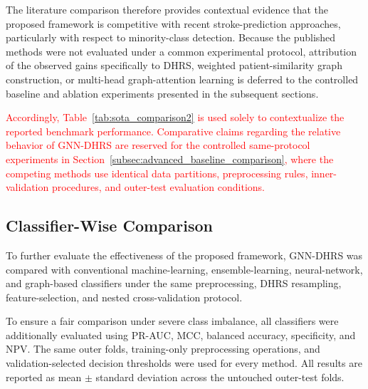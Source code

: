 \documentclass[pdflatex,sn-mathphys-num]{sn-jnl}%
\theoremstyle{thmstyleone}%
\theoremstyle{thmstyletwo}%
\theoremstyle{thmstylethree}%
\begin{document}
{
The literature comparison therefore provides contextual evidence that the
proposed framework is competitive with recent stroke-prediction approaches,
particularly with respect to minority-class detection. Because the published
methods were not evaluated under a common experimental protocol, attribution
of the observed gains specifically to DHRS, weighted patient-similarity graph
construction, or multi-head graph-attention learning is deferred to the
controlled baseline and ablation experiments presented in the subsequent
sections.
}

\textcolor{red}{
Accordingly, Table~\ref{tab:sota_comparison2} is used solely to contextualize
the reported benchmark performance. Comparative claims regarding the relative
behavior of GNN-DHRS are reserved for the controlled same-protocol
experiments in Section~\ref{subsec:advanced_baseline_comparison}, where the
competing methods use identical data partitions, preprocessing rules,
inner-validation procedures, and outer-test evaluation conditions.
}


\subsection{Classifier-Wise Comparison}
\label{subsec:classifierwise_comparison}

To further evaluate the effectiveness of the proposed framework, GNN-DHRS was
compared with conventional machine-learning, ensemble-learning, neural-network,
and graph-based classifiers under the same preprocessing, DHRS resampling,
feature-selection, and nested cross-validation protocol.

 {
To ensure a fair comparison under severe class imbalance, all classifiers were
additionally evaluated using PR-AUC, MCC, balanced accuracy, specificity, and
NPV. The same outer folds, training-only preprocessing operations, and
validation-selected decision thresholds were used for every method. All
results are reported as mean \(\pm\) standard deviation across the untouched
outer-test folds.
}
\end{document}
